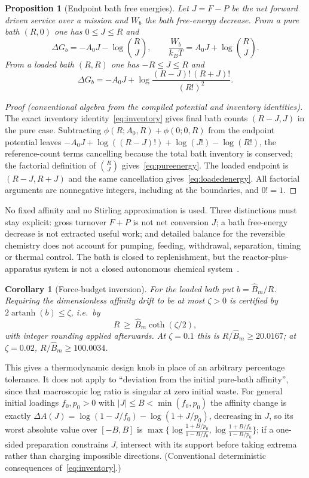 \documentclass[11pt,a4paper]{article}
\theoremstyle{plain}
\newtheorem{proposition}[theorem]{Proposition}
\newtheorem{corollary}[theorem]{Corollary}
\theoremstyle{definition}
\theoremstyle{remark}
\begin{document}
\begin{proposition}[Endpoint bath free energies]\label{prop:endpoint}
Let $J=F-P$ be the net forward driven service over a mission and $W_b$ the bath free-energy decrease. From a pure bath $(R,0)$ one has $0\le J\le R$ and
\begin{equation}\label{eq:pureenergy}
\Delta G_b=-A_0J-\log\binom RJ,\qquad \frac{W_b}{k_BT}=A_0J+\log\binom RJ .
\end{equation}
From a loaded bath $(R,R)$ one has $-R\le J\le R$ and
\begin{equation}\label{eq:loadedenergy}
\Delta G_b=-A_0J+\log\frac{(R-J)!\,(R+J)!}{(R!)^2}.
\end{equation}
\end{proposition}
\begin{proof}[Proof (conventional algebra from the compiled potential and inventory identities)]
The exact inventory identity~\eqref{eq:inventory} gives final bath counts $(R-J,J)$ in the pure case. Subtracting $\phi(R;A_0,R)+\phi(0;0,R)$ from the endpoint potential leaves $-A_0J+\log((R-J)!)+\log(J!)-\log(R!)$, the reference-count terms cancelling because the total bath inventory is conserved; the factorial definition of $\binom RJ$ gives~\eqref{eq:pureenergy}. The loaded endpoint is $(R-J,R+J)$ and the same cancellation gives~\eqref{eq:loadedenergy}. All factorial arguments are nonnegative integers, including at the boundaries, and $0!=1$.
\end{proof}
No fixed affinity and no Stirling approximation is used. Three distinctions must stay explicit: gross turnover $F+P$ is not net conversion $J$; a bath free-energy decrease is not extracted useful work; and detailed balance for the reversible chemistry does not account for pumping, feeding, withdrawal, separation, timing or thermal control. The bath is closed to replenishment, but the reactor-plus-apparatus system is not a closed autonomous chemical system~\citep{rao2018,esposito2012}.

\begin{corollary}[Force-budget inversion]\label{cor:force}
For the loaded bath put $b=\widehat B_m/R$. Requiring the dimensionless affinity drift to be at most $\zeta>0$ is certified by $2\operatorname{artanh}(b)\le\zeta$, i.e.\ by
\[
R\ \ge\ \widehat B_m\coth(\zeta/2),
\]
with integer rounding applied afterwards. At $\zeta=0.1$ this is $R/\widehat B_m\ge20.0167$; at $\zeta=0.02$, $R/\widehat B_m\ge100.0034$.
\end{corollary}
This gives a thermodynamic design knob in place of an arbitrary percentage tolerance. It does not apply to ``deviation from the initial pure-bath affinity'', since that macroscopic log ratio is singular at zero initial waste. For general initial loadings $f_0,p_0>0$ with $|J|\le B<\min(f_0,p_0)$ the affinity change is exactly $\Delta A(J)=\log(1-J/f_0)-\log(1+J/p_0)$, decreasing in $J$, so its worst absolute value over $[-B,B]$ is $\max\{\log\frac{1+B/p_0}{1-B/f_0},\log\frac{1+B/f_0}{1-B/p_0}\}$; if a one-sided preparation constrains $J$, intersect with its support before taking extrema rather than charging impossible directions. (Conventional deterministic consequences of~\eqref{eq:inventory}.)
\end{document}
